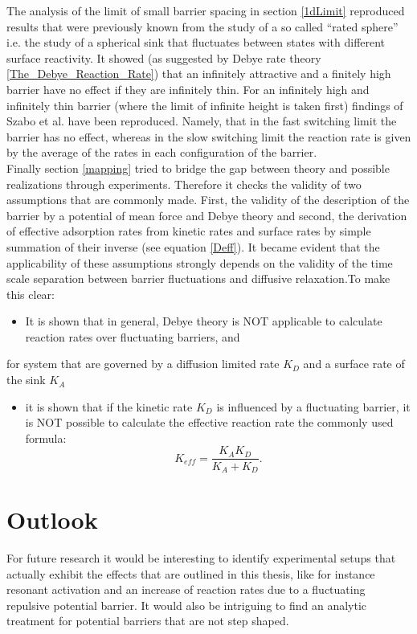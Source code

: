 The analysis of the limit of small barrier spacing in section \ref{1dLimit} reproduced results that were previously known from the study of a so called ``rated sphere'' i.e. the study of a spherical sink that fluctuates between states with different surface reactivity. It showed (as suggested by Debye rate theory \ref{The_Debye_Reaction_Rate}) that an infinitely attractive and a finitely high barrier have no effect if they are infinitely thin. For an infinitely high and infinitely thin barrier (where the limit of infinite height is taken first) findings of Szabo et al. \cite{Szabo1982} have been reproduced. Namely, that in the fast switching limit the barrier has no effect, whereas in the slow switching limit the reaction rate is given by the average of the rates in each configuration of the barrier. \\
Finally section \ref{mapping} tried to bridge the gap between theory and possible realizations through experiments. Therefore it checks the validity of two assumptions that are commonly made. First, the validity of the description of the barrier by a potential of mean force and Debye theory and second, the derivation of effective adsorption rates from kinetic rates and surface rates by simple summation of their inverse (see equation \eqref{Deff}). It became evident that the applicability of these assumptions strongly depends on the validity of the time scale separation between barrier fluctuations and diffusive relaxation.To make this clear:
\begin{itemize}
    \item It is shown that in general, Debye theory is NOT applicable to calculate reaction rates over fluctuating barriers, and
\end{itemize}
for system that are governed by a diffusion limited rate $K_D$ and a surface rate of the sink $K_A$
\begin{itemize}
    \item it is shown that if the kinetic rate $K_D$ is influenced by a fluctuating barrier, it is NOT possible to calculate the effective reaction rate the commonly used formula:
        \begin{equation}
            K_{eff} = \frac{K_A K_D}{K_A + K_D}. \nonumber
        \end{equation}
\end{itemize}
\section{Outlook}
For future research it would be interesting to identify experimental setups that actually exhibit the effects that are outlined in this thesis, like for instance resonant activation and an increase of reaction rates due to a fluctuating repulsive potential barrier. It would also be intriguing to find an analytic treatment for potential barriers that are not step shaped. 
